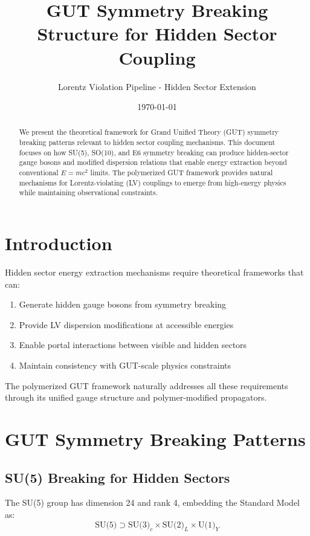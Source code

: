 \documentclass[11pt]{article}
\title{GUT Symmetry Breaking Structure for Hidden Sector Coupling}
\author{Lorentz Violation Pipeline - Hidden Sector Extension}
\date{\today}
\begin{document}
\maketitle

\begin{abstract}
    We present the theoretical framework for Grand Unified Theory (GUT) symmetry breaking patterns relevant to hidden sector coupling mechanisms. This document focuses on how SU(5), SO(10), and E6 symmetry breaking can produce hidden-sector gauge bosons and modified dispersion relations that enable energy extraction beyond conventional $E=mc^2$ limits. The polymerized GUT framework provides natural mechanisms for Lorentz-violating (LV) couplings to emerge from high-energy physics while maintaining observational constraints.
\end{abstract}

\section{Introduction}

Hidden sector energy extraction mechanisms require theoretical frameworks that can:
\begin{enumerate}
    \item Generate hidden gauge bosons from symmetry breaking
    \item Provide LV dispersion modifications at accessible energies
    \item Enable portal interactions between visible and hidden sectors
    \item Maintain consistency with GUT-scale physics constraints
\end{enumerate}

The polymerized GUT framework naturally addresses all these requirements through its unified gauge structure and polymer-modified propagators.

\section{GUT Symmetry Breaking Patterns}

\subsection{SU(5) Breaking for Hidden Sectors}

The SU(5) group has dimension 24 and rank 4, embedding the Standard Model as:
\begin{equation}
\text{SU(5)} \supset \text{SU(3)}_c \times \text{SU(2)}_L \times \text{U(1)}_Y
\end{equation}
\end{document}

